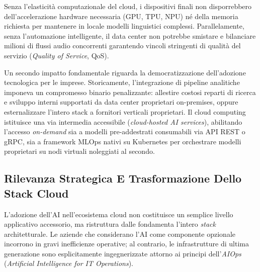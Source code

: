 \documentclass[11pt, a4paper]{article}
\begin{document}
Senza l'elasticità computazionale del cloud, i dispositivi finali non disporrebbero dell'accelerazione hardware necessaria (GPU, TPU, NPU) né della memoria richiesta per mantenere in locale modelli linguistici complessi. Parallelamente, senza l'automazione intelligente, il data center non potrebbe smistare e bilanciare milioni di flussi audio concorrenti garantendo vincoli stringenti di qualità del servizio (\emph{Quality of Service}, QoS).

Un secondo impatto fondamentale riguarda la democratizzazione dell'adozione tecnologica per le imprese. Storicamente, l'integrazione di pipeline analitiche imponeva un compromesso binario penalizzante: allestire costosi reparti di ricerca e sviluppo interni supportati da data center proprietari on-premises, oppure esternalizzare l'intero stack a fornitori verticali proprietari. Il cloud computing istituisce una via intermedia accessibile (\emph{cloud-hosted AI services}), abilitando l'accesso \emph{on-demand} sia a modelli pre-addestrati consumabili via API REST o gRPC, sia a framework MLOps nativi su Kubernetes per orchestrare modelli proprietari su nodi virtuali noleggiati al secondo.

\subsection{Rilevanza Strategica E Trasformazione Dello Stack Cloud}

L'adozione dell'AI nell'ecosistema cloud non costituisce un semplice livello applicativo accessorio, ma ristruttura dalle fondamenta l'intero \emph{stack} architetturale. Le aziende che considerano l'AI come componente opzionale incorrono in gravi inefficienze operative; al contrario, le infrastrutture di ultima generazione sono esplicitamente ingegnerizzate attorno ai principi dell'\emph{AIOps} (\emph{Artificial Intelligence for IT Operations}).

\end{document}
